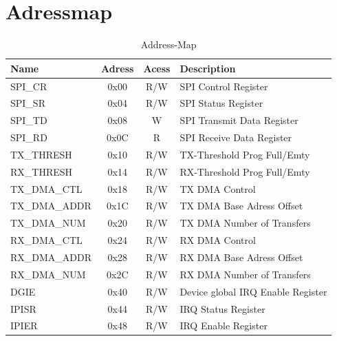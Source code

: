 \section{Adressmap}
\begin{table} [!h]
	\centering
		\begin{tabularx} {160mm} {|l|c|c|X|} \hline
		\textbf{Name}		& \textbf{Adress}	& \textbf{Acess}	& \textbf{Description} 				\\ \hline
		SPI\_CR					& 0x00						& R/W							& SPI Control Register				\\ \hline
		SPI\_SR					& 0x04						& R/W							& SPI  Status Register				\\ \hline
		SPI\_TD					& 0x08						& W								& SPI Transmit Data  Register \\ \hline
		SPI\_RD					& 0x0C						& R								& SPI Receive Data  Register 	\\ \hline		
		TX\_THRESH	  	& 0x10						& R/W							& TX-Threshold Prog Full/Emty	\\ \hline
		RX\_THRESH		  & 0x14						& R/W							& RX-Threshold Prog Full/Emty \\ \hline		
		TX\_DMA\_CTL		& 0x18						& R/W							& TX DMA Control							\\ \hline
		TX\_DMA\_ADDR		& 0x1C						& R/W							& TX DMA Base Adress Offset		\\ \hline	
		TX\_DMA\_NUM		& 0x20						& R/W							& TX DMA Number of Transfers	\\ \hline	
		RX\_DMA\_CTL		& 0x24						& R/W							& RX DMA Control							\\ \hline
		RX\_DMA\_ADDR		& 0x28						& R/W							& RX DMA Base Adress Offset		\\ \hline	
		RX\_DMA\_NUM		& 0x2C						& R/W							& RX DMA Number of Transfers	\\ \hline	
							
		DGIE	  				& 0x40						& R/W							& Device global IRQ Enable Register	\\ \hline	
		IPISR	   				& 0x44						& R/W							& IRQ Status Register	  			\\ \hline	
		IPIER	   				& 0x48						& R/W							& IRQ Enable Register	  			\\ \hline			
		\end{tabularx}
	\caption{Address-Map}
	\label{tab:registers}
\end{table}

